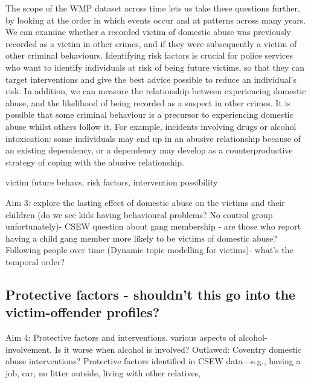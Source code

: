 \documentclass[12pt, letterpaper]{article}
\begin{document}
The scope of the WMP dataset across time lets us take these questions further, by looking at the order in which events occur and at patterns across many years. We can examine whether a recorded victim of domestic abuse was previously recorded as a victim in other crimes, and if they were subsequently a victim of other criminal behaviours. Identifying risk factors is crucial for police services who want to identify individuals at risk of being future victims, so that they can target interventions and give the best advice possible to reduce an individual's risk. In addition, we can measure the relationship between experiencing domestic abuse, and the likelihood of being recorded as a suspect in other crimes. It is possible that some criminal behaviour is a precursor to experiencing domestic abuse whilst others follow it. For example, incidents involving drugs or alcohol intoxication: some individuals may end up in an abusive relationship because of an existing dependency, or a dependency may develop as a counterproductive strategy of coping with the abusive relationship. 


victim future behavs, risk factors, intervention possibility

Aim 3: explore the lasting effect of domestic abuse on the victims and their children (do we see kids having behavioural problems? No control group unfortunately)- CSEW question about gang membership - are those who report having a child gang member more likely to be victims of domestic abuse? Following people over time (Dynamic topic modelling for victims)- what’s the temporal order? 

\subsection{Protective factors - shouldn't this go into the victim-offender profiles?}
Aim 4: Protective factors and interventions. various aspects of alcohol-involvement. Is it worse when alcohol is involved? {Outlawed: Coventry domestic abuse interventions?} Protective factors identified in CSEW data---e.g., having a job, car, no litter outside, living with other relatives,





\end{document}
